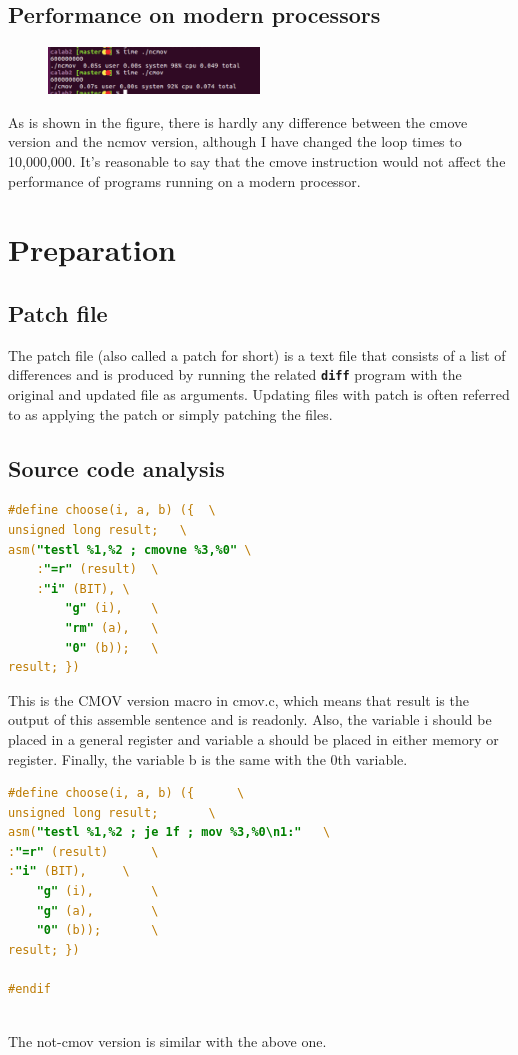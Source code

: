 \documentclass[10pt, a4paper, twocolumn]{article} %
\begin{document}
    \subsection{Performance on modern processors}
    \begin{figure}[!h]
        \centerline{\includegraphics[width=0.5\textwidth]{pics/cmov-branch.png}}
    \end{figure}
    As is shown in the figure, there is hardly any difference between the cmove version and the
    ncmov version, although I have changed the loop times to 10,000,000. It's reasonable to say that
    the cmove instruction would not affect the performance of programs running on a modern processor.
    \section{Preparation}
    \subsection{Patch file}
    The patch file (also called a patch for short) is a text file that consists of 
    a list of differences and is produced by running the related \textbf{\texttt{diff}} program with the 
    original and updated file as arguments. Updating files with patch is often referred to
     as applying the patch or simply patching the files.
    \subsection{Source code analysis}
    \begin{lstlisting}[language=C]
#define choose(i, a, b) ({	\
unsigned long result;	\
asm("testl %1,%2 ; cmovne %3,%0" \
    :"=r" (result)	\
    :"i" (BIT),	\
        "g" (i),	\
        "rm" (a),	\
        "0" (b));	\
result; })
    \end{lstlisting}
    This is the CMOV version macro in cmov.c, which means that result is the output of this 
    assemble sentence and is readonly. Also, the variable i should be placed in a general register and 
    variable a should be placed in either memory or register. Finally, the variable b is the same with 
    the 0th variable. 
    \begin{lstlisting}[language=C]
#define choose(i, a, b) ({		\
unsigned long result;		\
asm("testl %1,%2 ; je 1f ; mov %3,%0\n1:"	\
:"=r" (result)		\
:"i" (BIT),		\
    "g" (i),		\
    "g" (a),		\
    "0" (b));		\
result; })

#endif
        
    \end{lstlisting}
    The not-cmov version is similar with the above one. 
\end{document}
